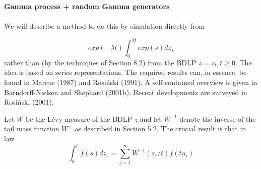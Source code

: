 ~\\
~\\
~\\
\textbf{Gamma process + random Gamma generators}\\\\
We will describe a method to do this by simulation directly from

\begin{equation}
exp(-\lambda t)  \int_{0}^{\lambda t} exp(s) dz_s
\end{equation} 
rather than (by the techniques of Section 8.2) from the BDLP $z = z_t, t\geq0$. The idea is based on series representations. The required results can, in essence, be found in Marcus (1987) and Rosi\'{n}ski (1991). A self-contained overview is given in Barndorff-Nielsen and Shephard (2001b). Recent developments are surveyed in Rosi\'{n}ski (2001).

Let $W$ be the L\'{e}vy measure of the BDLP $z$ and let $W^{-1}$ denote the inverse of the tail mass function $W^{+}$ as described in Section 5.2. The crucial result is that in law
\begin{equation}
\int_{0}^{t} f(s) dz_s = \sum_{j=1}^{\infty} W^{-1}(a_i/t) f(tu_i)
\end{equation} 

